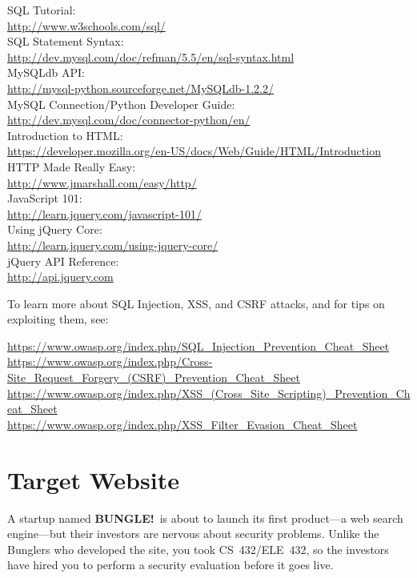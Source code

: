 \documentclass[letterpaper,12pt]{report}
\begin{document}
SQL Tutorial:\\
\url{http://www.w3schools.com/sql/} \\
SQL Statement Syntax:\\
\url{http://dev.mysql.com/doc/refman/5.5/en/sql-syntax.html} \\
MySQLdb API:\\
\url{http://mysql-python.sourceforge.net/MySQLdb-1.2.2/} \\
MySQL Connection/Python Developer Guide:\\
\url{http://dev.mysql.com/doc/connector-python/en/} \\
Introduction to HTML:\\ \url{https://developer.mozilla.org/en-US/docs/Web/Guide/HTML/Introduction} \\
HTTP Made Really Easy:\\
\url{http://www.jmarshall.com/easy/http/} \\
JavaScript 101:\\
\url{http://learn.jquery.com/javascript-101/} \\
Using jQuery Core:\\ 
\url{http://learn.jquery.com/using-jquery-core/} \\
jQuery API Reference:\\
\url{http://api.jquery.com} \\

\bigskip

To learn more about SQL Injection, XSS, and CSRF attacks, and for tips on exploiting them, see:
\medskip

\url{https://www.owasp.org/index.php/SQL_Injection_Prevention_Cheat_Sheet}\\
\url{https://www.owasp.org/index.php/Cross-Site_Request_Forgery_(CSRF)_Prevention_Cheat_Sheet}\\
\url{https://www.owasp.org/index.php/XSS_(Cross_Site_Scripting)_Prevention_Cheat_Sheet}\\
\url{https://www.owasp.org/index.php/XSS_Filter_Evasion_Cheat_Sheet}\\



\section*{Target Website}
\newcommand{\note}[1]{\textsl{#1}}
\newcommand\bungle{\textsf{\bfseries{B{\scriptsize UNGLE}!}}}

A startup named \bungle\ is about to launch its first product---a web search engine---but their investors are nervous about security problems.  Unlike the Bunglers who developed the site, you took CS~432/ELE~432, so the investors have hired you to perform a security evaluation before it goes live.
\end{document}
